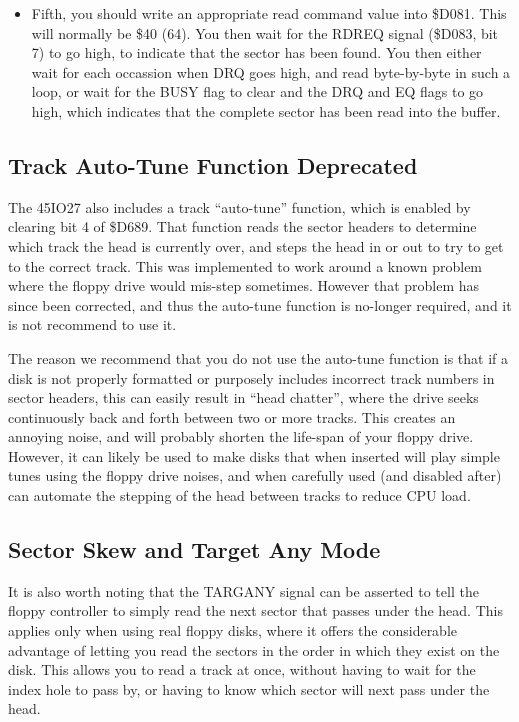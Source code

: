 \begin{itemize}
\item Fifth, you should write an appropriate read command
value into \$D081.  This will normally be \$40 (64).  You then wait
for the RDREQ signal (\$D083, bit 7) to go high, to indicate that the
sector has been found. You then either wait for each occassion when
DRQ goes high, and read byte-by-byte in such a loop, or wait for the
BUSY flag to clear and the DRQ and EQ flags to go high, which indicates
that the complete sector has been read into the buffer.

\end{itemize}

\subsection{Track Auto-Tune Function Deprecated}

The 45IO27 also includes a track ``auto-tune'' function, which is enabled
by clearing bit 4 of \$D689.  That function reads the sector headers to
determine which track the head is currently over, and steps the head in or
out to try to get to the correct track. This was implemented to work around
a known problem where the floppy drive would mis-step sometimes.  However
that problem has since been corrected, and thus the auto-tune function is
no-longer required, and it is not recommend to use it.

The reason we recommend that you do not use the auto-tune function is that if
a disk is not properly formatted
or purposely includes incorrect track numbers in sector headers, this can
easily result in ``head chatter'', where the drive seeks continuously back
and forth between two or more tracks.  This creates an annoying noise, and will
probably shorten the life-span of your floppy drive. However, it can likely
be used to make disks that when inserted will play simple tunes using the
floppy drive noises, and when carefully used (and disabled after) can
automate the stepping of the head between tracks to reduce CPU load. 

\subsection{Sector Skew and Target Any Mode}

It is also worth noting that the TARGANY signal can be asserted to
tell the floppy controller to simply read the next sector that passes
under the head.  This applies only when using real floppy disks, where
it offers the considerable advantage of letting you read the sectors
in the order in which they exist on the disk. This allows you to read
a track at once, without having to wait for the index hole to pass by,
or having to know which sector will next pass under the head.

